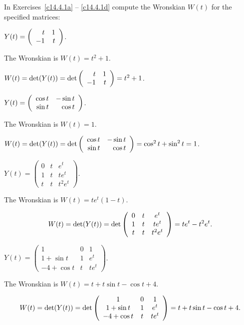 \documentclass{ximera}
\begin{document}
\TEXER

In Exercises~\ref{c14.4.1a} -- \ref{c14.4.1d} compute the Wronskian
$W(t)$ for the specified matrices:

\begin{exercise} \label{c14.4.1a}
$Y(t) = \left(\begin{array}{rr} t & 1\\ -1 &t\end{array}\right)$.

\begin{solution}
\ans The Wronskian is $W(t) = t^2 + 1$.

\soln $W(t) = \det(Y(t)) = \det\left(\begin{array}{rr} t & 1\\ -1 &t\end{array}\right) = t^2 + 1$.

\end{solution}
\end{exercise}

\begin{exercise} \label{c14.4.1b}
$Y(t) = \left(\begin{array}{rr} \cos t & -\sin t\\ \sin t &\cos t\end{array}\right)$.

\begin{solution}
\ans The Wronskian is $W(t) = 1$.

\soln $W(t) = \det(Y(t)) = \det\left(\begin{array}{rr} \cos t & -\sin t\\ \sin t &\cos t\end{array}\right) =
\cos^2 t + \sin^2 t = 1$.

\end{solution}
\end{exercise}

\begin{exercise} \label{c14.4.1c}
$Y(t) = \left(\begin{array}{ccc}
0 & t & e^t\\  1 & t & te^t \\ t & t & t^2 e^t \end{array}\right)$.

\begin{solution}
\ans The Wronskian is $W(t) = te^t(1 - t)$.

\soln
\[
W(t) = \det(Y(t)) = \det\left(\begin{array}{ccc} 0 & t & e^t \\ 1 & t & te^t \\ t & t & t^2e^t\end{array}\right)
= te^t - t^2e^t.
\]

\end{solution}
\end{exercise}

\begin{exercise} \label{c14.4.1d}
$Y(t) = \left(\begin{array}{ccc}
1 & 0 & 1\\  1 + \sin t & 1 & e^t \\ -4 + \cos t & t & te^t 
\end{array}\right)$.

\begin{solution}
\ans The Wronskian is $W(t) = t + t\sin t - \cos t + 4$.

\soln
\[
W(t) = \det(Y(t)) =
\det\left(\begin{array}{ccc} 1 & 0 & 1 \\ 1 + \sin t & 1 & e^t \\ -4 + \cos t & t & te^t\end{array}\right) =
t + t\sin t - \cos t + 4.
\]

\end{solution}
\end{exercise}
\end{document}
